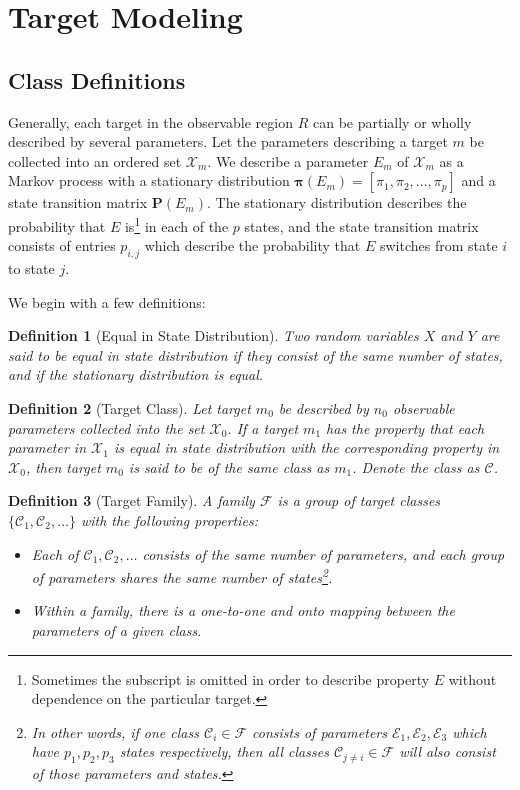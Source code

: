 \documentclass[journal,12pt,onecolumn,draftclsnofoot,]{IEEEtran}
\newtheorem{definition}{Definition}
\theoremstyle{definition}
\begin{document}
\section{Target Modeling}
\label{sec:targets}
\subsection{Class Definitions}
\label{ss:classes}
Generally, each target in the observable region $R$ can be partially or wholly described by several parameters. 
Let the parameters describing a target $m$ be collected into an ordered set $\mathcal{X}_m$. 
We describe a parameter $E_m$ of $\mathcal{X}_m$ as a Markov process with a stationary distribution $\boldsymbol{\pi}(E_m)=[\pi_1, \pi_2, \dots, \pi_p]$ and a state transition matrix $\mathbf{P}(E_m)$. 
The stationary distribution describes the probability that $E$ is\footnote{Sometimes the subscript is omitted in order to describe property $E$ without dependence on the particular target. } in each of the $p$ states, and the state transition matrix consists of entries $p_{i,j}$ which describe the probability that $E$ switches from state $i$ to state $j$. 

We begin with a few definitions: 

\begin{definition}[Equal in State Distribution]
\label{def:eq_in_dist}
    Two random variables $X$ and $Y$ are said to be equal in state distribution if they consist of the same number of states, and if the stationary distribution is equal.  
\end{definition}

\begin{definition}[Target Class]
\label{def:target_class}
    Let target $m_0$ be described by $n_0$ observable parameters collected into the set $\mathcal{X}_0$. If a target $m_1$ has the property that each parameter in $\mathcal{X}_1$ is equal in state distribution with the corresponding property in $\mathcal{X}_0$, then target $m_0$ is said to be of the same class as $m_1$.  Denote the class as $\mathcal{C}$. 
\end{definition}


\begin{definition}[Target Family]
\label{def:target_family}
    A family $\mathcal{F}$ is a group of target classes $\{\mathcal{C}_1, \mathcal{C}_2, \dots\}$ with the following properties: 
\begin{itemize}
	\item Each of $\mathcal{C}_1, \mathcal{C}_2, \dots$ consists of the same number of parameters, and each group of parameters shares the same number of states\footnote{In other words, if one class $\mathcal{C}_i\in\mathcal{F}$ consists of parameters $\mathcal{E}_1, \mathcal{E}_2, \mathcal{E}_3$ which have $p_1, p_2, p_3$ states respectively, then all classes $\mathcal{C}_{j\neq i} \in \mathcal{F}$ will also consist of those parameters and states. }. 
	\item Within a family, there is a one-to-one and onto mapping between the parameters of a given class. 
\end{itemize}
\end{definition}
\end{document}
